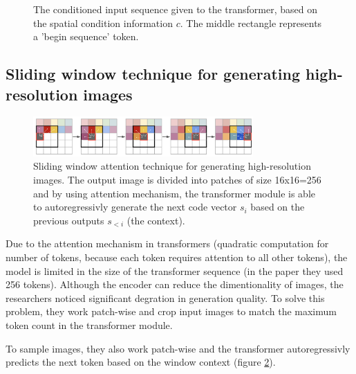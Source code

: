 \begin{figure}
    \centering
    \label{fig:vqgan_conditional_generation}
    \caption{The conditioned input sequence given to the transformer, based on the spatial condition information $c$. The middle rectangle represents a 'begin sequence' token.}
\end{figure}






\subsection{Sliding window technique for generating high-resolution images}

\begin{figure}[h]
    \centering
    \includegraphics[width=0.75\textwidth]{images/vqgan_sliding_attention.png}
    \caption{Sliding window attention technique for generating high-resolution images. The output image is divided into patches of size 16x16=256 and by using attention mechanism, the transformer module is able to autoregressivly generate the next code vector $s_i$ based on the previous outputs $s_{<i}$ (the context).}
    \label{fig:vqgan_sliding_window}
\end{figure}

Due to the attention mechanism in transformers (quadratic computation for number of tokens, because each token requires attention to all other tokens), the model is limited in the size of the transformer sequence (in the paper they used 256 tokens). Although the encoder can reduce the dimentionality of images, the researchers noticed significant degration in generation quality. To solve this problem, they work patch-wise and crop input images to match the maximum token count in the transformer module.

To sample images, they also work patch-wise and the transformer autoregressivly predicts the next token based on the window context (figure \ref{fig:vqgan_sliding_window}).

